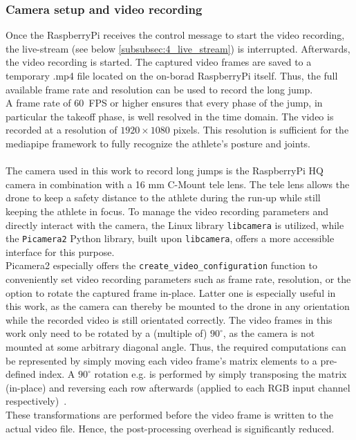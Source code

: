 \subsubsection{Camera setup and video recording}\label{subsubsec:4_cam_setup_recording}
Once the RaspberryPi receives the control message to start the video
recording, the live-stream (see below \autoref{subsubsec:4_live_stream}) is
interrupted. 
Afterwards, the video recording is started.
The captured video frames are saved to a temporary .mp4 file located on the
on-borad RaspberryPi itself.
Thus, the full available frame rate and resolution can be used to record the
long jump.\\
A frame rate of 60~\ac{FPS} or higher ensures that every phase of the
jump, in particular the takeoff phase, is well resolved in the time domain.
The video is recorded at a resolution of $1920 \times 1080$ pixels.
This resolution is sufficient for the mediapipe framework to fully recognize
the athlete's posture and joints.\\\\
\noindent The camera used in this work to record long jumps is the RaspberryPi
HQ camera in combination with a 16 mm C-Mount tele lens.
The tele lens allows the drone to keep a safety distance to the athlete
during the run-up while still keeping the athlete in focus. 
To manage the video recording parameters and directly interact with the
camera, the Linux library \texttt{libcamera} is utilized, while the
\texttt{Picamera2} Python library, built upon \texttt{libcamera}, offers a
more accessible interface for this purpose.\\
Picamera2 especially offers the \texttt{create\_video\_configuration} function
to conveniently set video recording parameters such as frame rate, resolution,
or the option to rotate the captured frame in-place. 
Latter one is especially useful in this work, as the camera can thereby be
mounted to the drone in any orientation while the recorded video is still
orientated correctly.
The video frames in this work only need to be rotated by a (multiple of)
$90^{\circ}$, as the camera is not mounted at some arbitrary diagonal angle. 
Thus, the required computations can be represented by simply moving each
video frame's matrix elements to a pre-defined index.
A $90^{\circ}$ rotation e.g. is performed by simply transposing the matrix
(in-place) and reversing each row afterwards (applied to each RGB input channel
respectively)~\cite{godardEfficientOutofCoreOutofPlace2021}.\\
These transformations are performed before the video frame is written to
the actual video file.
Hence, the post-processing overhead is significantly reduced.

